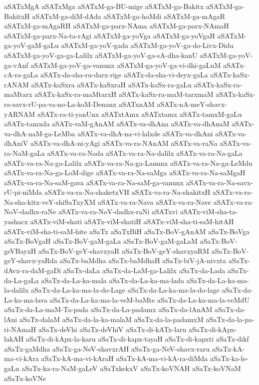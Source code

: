 {aSATxMgA
aSATxMga
aSATxM-ga-BU-mige
aSATxM-ga-Bakitx
aSATxM-ga-BakitxH
aSATxM-ga-diM-dAda
aSATxM-ga-hoMdi
aSATxM-ga-mAgaR
aSATxM-ga-mAgaRH
aSATxM-ga-parx-NAma
aSATxM-ga-parx-NAmaH
aSATxM-ga-parx-Na-ta-rAgi
aSATxM-ga-yoVga
aSATxM-ga-yoVgaH
aSATxM-ga-yoV-gaM-gaLu
aSATxM-ga-yoV-gada
aSATxM-ga-yoV-ga-do-Livx-Didu
aSATxM-ga-yoV-ga-ga-Lalilx
aSATxM-ga-yoV-ga-sA-dha-kanU
aSATxM-ga-yoV-ga-vAnf
aSATxM-ga-yoV-ga-vanunx
aSATxM-ga-yoV-ga-vi-dhi-gaLuM
aSATx-cA-ra-gaLa
aSATx-da-sha-ru-darx-rige
aSATx-da-sha-vi-deyx-gaLa
aSATx-kaSx-rANAM
aSATx-kaSxra
aSATx-kaSxraH
aSATx-kaSx-ra-gaLu
aSATx-kaSx-ra-maMtarx
aSATx-kaSx-ra-maMtarxH
aSATx-kaSx-ra-maM-tarxmaM
aSATx-kaSx-ra-savx-rU-pa-va-no-La-koM-Denanx
aSATxnAM
aSATx-nA-meY-shavx-yARNAM
aSATx-ra-ti-yanUnx
aSATxtAmx
aSATxtamx
aSATx-tamxM-gaLu
aSATx-tamxda
aSATx-vaM-gAnAM
aSATx-va-dhAna
aSATx-va-dhAnaM
aSATx-va-dhA-naM-ga-LeMba
aSATx-va-dhA-na-vi-lalxde
aSATx-va-dhAni
aSATx-va-dhAniV
aSATx-va-dhA-ni-yAgi
aSATx-va-ra-NAnAM
aSATx-va-raNa
aSATx-va-ra-NaM-gaLa
aSATx-va-ra-Nada
aSATx-va-ra-Na-dalilx
aSATx-va-ra-Na-gaLa
aSATx-va-ra-Na-ga-Lalilx
aSATx-va-ra-Na-ga-Lanunx
aSATx-va-ra-Na-ga-LeMdu
aSATx-va-ra-Na-ga-LoM-dige
aSATx-va-ra-Na-saMga
aSATx-va-ra-Na-saMgaH
aSATx-va-ra-Na-saM-gava
aSATx-va-ra-Na-saM-ga-vanunx
aSATx-va-ra-Na-savx-rU-pi-niMda
aSATx-va-ra-Na-shaketxVH
aSATx-va-ra-Na-shakitxH
aSATx-va-ra-Na-sha-kitx-veY-shiSaTxyXM
aSATx-va-ra-Nava
aSATx-va-ra-Nave
aSATx-va-ra-NoV-dadhx-raNe
aSATx-va-ra-NoV-dadhx-raNi
aSATxvi
aSATx-viM-sha-ta-yashacx
aSATx-viM-shati
aSATx-viM-shatiH
aSATx-viM-sha-ti-saM-hitAH
aSATx-viM-sha-ti-saM-hite
aSaTx
aSaTxBiH
aSaTx-BoV-gAnAM
aSaTx-BoVga
aSaTx-BoVgaH
aSaTx-BoV-gaM-gaLa
aSaTx-BoV-gaM-gaLaM
aSaTx-BoV-geVBayxH
aSaTx-BoV-geY-shavxyaR
aSaTx-BoV-geY-shavxyaRM
aSaTx-BoV-geY-shavx-yaRda
aSaTx-baMdha
aSaTx-baMdhaH
aSaTx-biV-jA-nivxta
aSaTx-dAvx-ra-daM-gaDi
aSaTx-daLa
aSaTx-da-LaM-ga-Lalilx
aSaTx-da-Lada
aSaTx-da-La-gaLa
aSaTx-da-La-ka-mala
aSaTx-da-La-ka-ma-lada
aSaTx-da-La-ka-ma-la-dalilx
aSaTx-da-La-ka-ma-la-do-Lage
aSaTx-da-La-ka-ma-la-do-lage
aSaTx-da-La-ka-ma-lava
aSaTx-da-La-ka-ma-la-veM-baMte
aSaTx-da-La-ka-ma-la-veMdU
aSaTx-da-La-maM-Ta-pada
aSaTx-da-La-padamx
aSaTx-da-lAnAM
aSaTx-da-lAni
aSaTx-dalaM
aSaTx-da-la-ka-malaM
aSaTx-da-la-padamxM
aSaTx-da-la-pa-ri-NAmaH
aSaTx-deVhi
aSaTx-deVhiV
aSaTx-di-kATx-laru
aSaTx-di-kApx-lakAH
aSaTx-di-kApx-la-karu
aSaTx-di-kapx-tayaH
aSaTx-di-kapxti
aSaTx-dikf
aSaTx-gaMdha
aSaTx-ga-NeV-shavxrAH
aSaTx-ga-NeV-shavx-raru
aSaTx-kA-ma-vi-kAra
aSaTx-kA-ma-vi-kAraH
aSaTx-kA-ma-vi-kA-ra-diMda
aSaTx-ka-le-gaLu
aSaTx-ka-ra-NaM-gaLeV
aSaTxkekxV
aSaTx-koVNAH
aSaTx-koVNaM
aSaTx-koVNe
}
